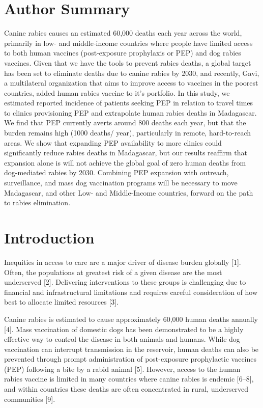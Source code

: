 \documentclass[
  oneside]{book}
\begin{document}
\hypertarget{author-summary}{%
\section*{Author Summary}\label{author-summary}}

Canine rabies causes an estimated 60,000 deaths each year across the
world, primarily in low- and middle-income countries where people have
limited access to both human vaccines (post-exposure prophylaxis or PEP)
and dog rabies vaccines. Given that we have the tools to prevent rabies
deaths, a global target has been set to eliminate deaths due to canine
rabies by 2030, and recently, Gavi, a multilateral organization that
aims to improve access to vaccines in the poorest countries, added human
rabies vaccine to it's portfolio. In this study, we estimated reported
incidence of patients seeking PEP in relation to travel times to clinics
provisioning PEP and extrapolate human rabies deaths in Madagascar. We
find that PEP currently averts around 800 deaths each year, but that the
burden remains high (1000 deaths/ year), particularly in remote,
hard-to-reach areas. We show that expanding PEP availability to more
clinics could significantly reduce rabies deaths in Madagascar, but our
results reaffirm that expansion alone is will not achieve the global
goal of zero human deaths from dog-mediated rabies by 2030. Combining
PEP expansion with outreach, surveillance, and mass dog vaccination
programs will be necessary to move Madagascar, and other Low- and
Middle-Income countries, forward on the path to rabies elimination.

\hypertarget{introduction-2}{%
\section{Introduction}\label{introduction-2}}

Inequities in access to care are a major driver of disease burden
globally {[}1{]}. Often, the populations at greatest risk of a given
disease are the most underserved {[}2{]}. Delivering interventions to
these groups is challenging due to financial and infrastructural
limitations and requires careful consideration of how best to allocate
limited resources {[}3{]}.

Canine rabies is estimated to cause approximately 60,000 human deaths
annually {[}4{]}. Mass vaccination of domestic dogs has been demonstrated
to be a highly effective way to control the disease in both animals and
humans. While dog vaccination can interrupt transmission in the
reservoir, human deaths can also be prevented through prompt
administration of post-exposure prophylactic vaccines (PEP) following a
bite by a rabid animal {[}5{]}. However, access to the human rabies
vaccine is limited in many countries where canine rabies is endemic
{[}6--8{]}, and within countries these deaths are often concentrated in
rural, underserved communities {[}9{]}.
\end{document}
